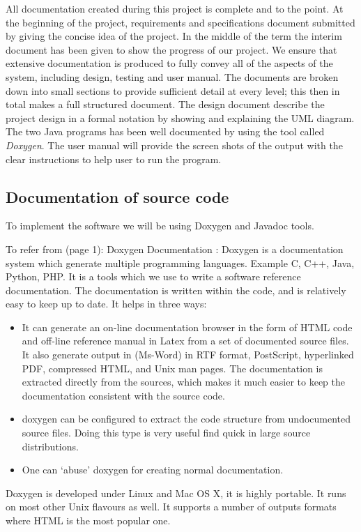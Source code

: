 \documentclass{article}
\begin{document}
All documentation created during this project is complete and to the point. At the beginning of the project, requirements and specifications document submitted by giving the concise idea of the project. In the middle of the term the interim document has been given to show the progress of our project. We ensure that extensive documentation is produced to fully convey all of the aspects of the system, including design, testing and user manual. The documents are broken down into small sections to provide sufficient detail at every level; this then in total makes a full structured document.
The design document describe the project design in a formal notation by showing and explaining the UML diagram. The two Java programs has been well documented by using the tool called \emph{Doxygen}.
The user manual will provide the screen shots of the output with the clear instructions to help user to run the program.

\subsection{Documentation of source code}
\label{sec:doc}

To implement the software we will be using Doxygen and Javadoc tools. 

To refer from  \cite{Doxygen}(page 1): Doxygen Documentation : Doxygen is a documentation system which generate multiple programming languages. Example C, C++, Java, Python, PHP. It is a tools which we use to write a software reference documentation. The documentation is written within the code, and is relatively easy to keep up to date.
It helps in three ways: 
\begin{itemize}
\item It can generate an on-line documentation browser in the form of HTML code and off-line reference manual in Latex from a set of documented source files. It also generate output in (Ms-Word) in RTF format, PostScript, hyperlinked PDF, compressed HTML, and Unix man pages. The documentation is extracted directly from the sources, which makes it much easier to keep the documentation consistent with the source code.
\item doxygen can be configured to extract the code structure from undocumented source files. Doing this type is very useful find quick in large source distributions.
\item One can `abuse' doxygen for creating normal documentation.
\end{itemize}
Doxygen is developed under Linux and Mac OS X, it is highly portable. It runs on most other Unix flavours as well. It supports a number of outputs formats where HTML is the most popular one. 
\end{document}

